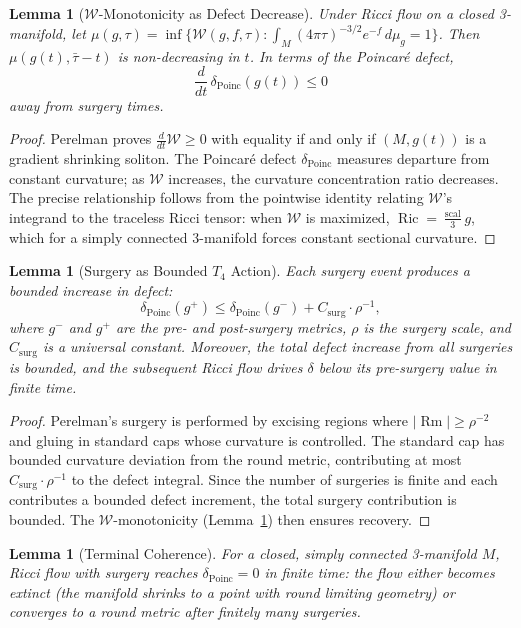 \documentclass[11pt]{article}
\newtheorem{lemma}[theorem]{Lemma}
\DeclareMathOperator{\Ric}{Ric}
\DeclareMathOperator{\Rm}{Rm}
\DeclareMathOperator{\scal}{scal}
\begin{document}
\begin{lemma}[$\mathcal{W}$-Monotonicity as Defect Decrease]
\label{lem:W-mono}
Under Ricci flow on a closed 3-manifold, let
$\mu(g,\tau) = \inf\{\mathcal{W}(g,f,\tau) :
\int_M (4\pi\tau)^{-3/2} e^{-f}\, d\mu_g = 1\}$.
Then $\mu(g(t), \bar\tau - t)$ is non-decreasing in $t$.
In terms of the Poincar\'e defect,
\[
\frac{d}{dt}\, \delta_{\mathrm{Poinc}}(g(t)) \leq 0
\]
away from surgery times.
\end{lemma}

\begin{proof}
Perelman \cite{Per1} proves $\frac{d}{dt}\mathcal{W} \geq 0$ with
equality if and only if $(M, g(t))$ is a gradient shrinking soliton.
The Poincar\'e defect $\delta_{\mathrm{Poinc}}$ measures departure from
constant curvature; as $\mathcal{W}$ increases, the curvature
concentration ratio decreases.  The precise relationship follows
from the pointwise identity relating $\mathcal{W}$'s integrand to the
traceless Ricci tensor: when $\mathcal{W}$ is maximized,
$\Ric = \frac{\scal}{3} g$, which for a simply connected 3-manifold
forces constant sectional curvature.
\end{proof}

\begin{lemma}[Surgery as Bounded $T_4$ Action]
\label{lem:surgery}
Each surgery event produces a bounded increase in defect:
\[
\delta_{\mathrm{Poinc}}(g^+) \leq \delta_{\mathrm{Poinc}}(g^-)
+ C_{\mathrm{surg}} \cdot \rho^{-1},
\]
where $g^-$ and $g^+$ are the pre- and post-surgery metrics,
$\rho$ is the surgery scale, and $C_{\mathrm{surg}}$ is a universal
constant.  Moreover, the total defect increase from all surgeries is
bounded, and the subsequent Ricci flow drives $\delta$ below its
pre-surgery value in finite time.
\end{lemma}

\begin{proof}
Perelman's surgery is performed by excising regions where
$|\Rm| \geq \rho^{-2}$ and gluing in standard caps whose curvature
is controlled.  The standard cap has bounded curvature deviation from
the round metric, contributing at most $C_{\mathrm{surg}} \cdot
\rho^{-1}$ to the defect integral.  Since the number of surgeries is
finite \cite{Per2} and each contributes a bounded defect increment,
the total surgery contribution is bounded.  The $\mathcal{W}$-monotonicity
(Lemma~\ref{lem:W-mono}) then ensures recovery.
\end{proof}

\begin{lemma}[Terminal Coherence]
\label{lem:terminal}
For a closed, simply connected 3-manifold $M$, Ricci flow with surgery
reaches $\delta_{\mathrm{Poinc}} = 0$ in finite time: the flow either
becomes extinct (the manifold shrinks to a point with round limiting
geometry) or converges to a round metric after finitely many surgeries.
\end{lemma}
\end{document}
